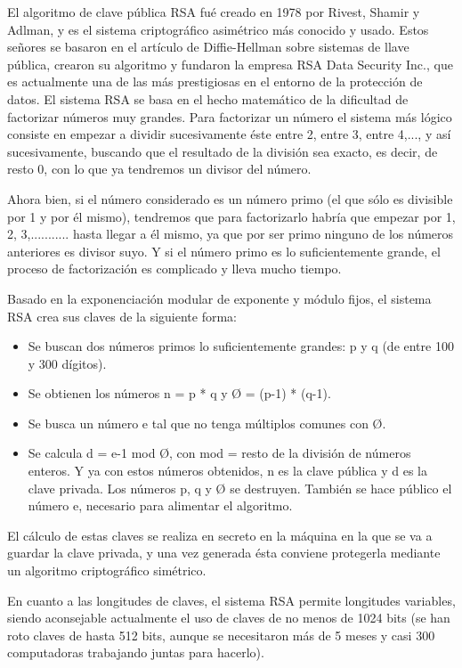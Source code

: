 El algoritmo de clave pública RSA fué creado en 1978 por Rivest, Shamir y Adlman, y es el sistema criptográfico asimétrico más conocido y usado. Estos señores se basaron en el artículo de Diffie-Hellman sobre sistemas de llave pública, crearon su algoritmo y fundaron la empresa RSA Data Security Inc., que es actualmente una de las más prestigiosas en el entorno de la protección de datos.
El sistema RSA se basa en el hecho matemático de la dificultad de factorizar números muy grandes. Para factorizar un número el sistema más lógico consiste en empezar a dividir sucesivamente éste entre 2, entre 3, entre 4,..., y así sucesivamente, buscando que el resultado de la división sea exacto, es decir, de resto 0, con lo que ya tendremos un divisor del número.

Ahora bien, si el número considerado es un número primo (el que sólo es divisible por 1 y por él mismo), tendremos que para factorizarlo habría que empezar por 1, 2, 3,........... hasta llegar a él mismo, ya que por ser primo ninguno de los números anteriores es divisor suyo. Y si el número primo es lo suficientemente grande, el proceso de factorización es complicado y lleva mucho tiempo.

Basado en la exponenciación modular de exponente y módulo fijos, el sistema RSA crea sus claves de la siguiente forma:
\begin{itemize}

	\item Se buscan dos números primos lo suficientemente grandes: p y q (de entre 100 y 300 dígitos).
	\item Se obtienen los números n = p * q y Ø = (p-1) * (q-1).
	\item Se busca un número e tal que no tenga múltiplos comunes con Ø.
	\item Se calcula d = e-1 mod Ø, con mod = resto de la división de números enteros. Y ya con estos números obtenidos, n es la clave pública y d es la clave privada. Los números p, q y Ø se destruyen. También se hace público el número e, necesario para alimentar el algoritmo.
\end{itemize} 

El cálculo de estas claves se realiza en secreto en la máquina en la que se va a guardar la clave privada, y una vez generada ésta conviene protegerla mediante un algoritmo criptográfico simétrico.

En cuanto a las longitudes de claves, el sistema RSA permite longitudes variables, siendo aconsejable actualmente el uso de claves de no menos de 1024 bits (se han roto claves de hasta 512 bits, aunque se necesitaron más de 5 meses y casi 300 computadoras trabajando juntas para hacerlo).

